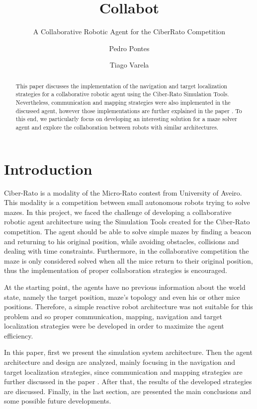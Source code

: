 \documentclass[oribibl]{llncs}
\title{Collabot}
\subtitle{A Collaborative Robotic Agent for the CiberRato Competition  }
\author{Pedro Pontes \and Tiago Varela}
\institute{Faculdade de Engenharia da Universidade do Porto}
\begin{document}
\maketitle
\begin{abstract}
This paper discusses the implementation of the navigation and target localization strategies for a  collaborative robotic agent using the Ciber-Rato Simulation Tools. Nevertheless, communication and mapping strategies were also implemented in the discussed agent, however those implementations are further explained in the paper \cite{baboehelder}.
To this end, we particularly focus on developing an interesting solution for a maze solver agent and explore the collaboration between robots with similar architectures.
\end{abstract}

\section{Introduction}
Ciber-Rato is a modality of the Micro-Rato contest from University of Aveiro. This modality is a competition between small autonomous robots trying to solve mazes. \cite{Lau2002} 
In this project, we faced the challenge of developing a collaborative robotic agent architecture using the Simulation Tools created for the Ciber-Rato competition. The agent should be able to solve simple mazes by finding a beacon and returning to his original position, while avoiding obstacles, collisions and dealing with time constraints. Furthermore, in the collaborative competition the maze is only considered solved when all the mice return to their original position, thus the implementation of proper collaboration strategies is encouraged.

At the starting point, the agents have no previous information about the world state, namely the target position, maze's topology and even his or other mice positions. Therefore, a simple reactive robot architecture was not suitable for this problem and so proper communication, mapping, navigation and target localization strategies were be developed in order to maximize the agent efficiency.

In this paper, first we present the simulation system architecture. Then the agent architecture and design are analyzed, mainly focusing in the navigation and target localization strategies, since communication and mapping strategies are further discussed in the paper \cite{baboehelder}. After that, the results of the developed strategies are discussed. Finally, in the last section, are presented the main conclusions and some possible future developments.
\end{document}
